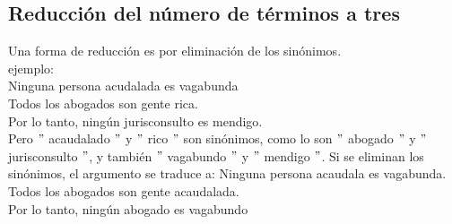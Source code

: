 \documentclass[10pt]{book} 						%
\begin{document}
\subsection{Reducción del número de términos a tres}
Una forma de reducción es por eliminación de los sinónimos.\\
ejemplo:\\
Ninguna persona acudalada es vagabunda\\
Todos los abogados son gente rica.\\
Por lo tanto, ningún jurisconsulto es mendigo.\\
Pero $"$ acaudalado $"$ y $"$ rico $"$ son sinónimos, como lo son $"$ abogado $"$ y $"$ jurisconsulto $"$, y también $"$ vagabundo $"$ y $"$ mendigo  $"$. Si se eliminan los sinónimos, el argumento se traduce a:
Ninguna persona acaudala es vagabunda.\\
Todos los abogados son gente acaudalada.\\
Por lo tanto, ningún abogado es vagabundo\\
\end{document}
